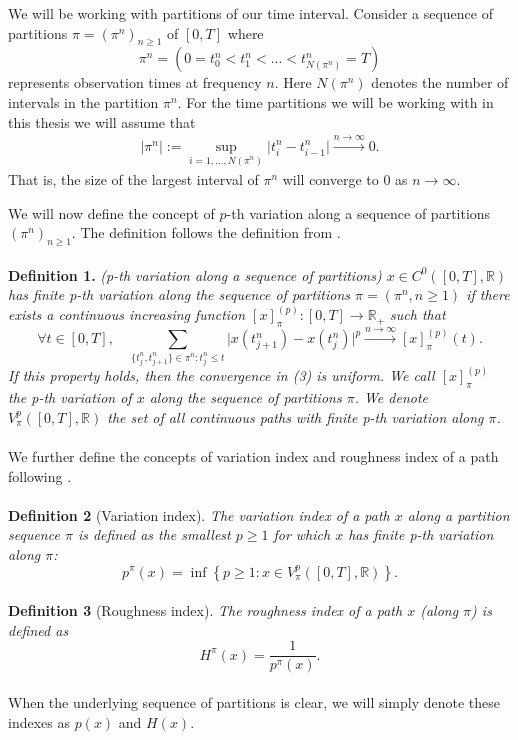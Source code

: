 \documentclass{article}
\begin{document}
We will be working with partitions of our time interval. Consider a sequence of partitions $\pi = (\pi^n) _{n\geq 1}$ of $[0,T]$ where
\[
\pi^n = \left( 0 = t_0^n < t_1^n < ... < t^n_{N(\pi^n)}=T \right)
\]
represents observation times at frequency $n$. Here $N(\pi^n)$ denotes the number of intervals in the partition $\pi^n$. For the time partitions we will be working with in this thesis we will assume that 
\begin{align}
\lvert \pi^n \rvert := \sup_{i=1, \dots, N(\pi^n)} \lvert t_i^n - t_{i-1}^n \rvert \xrightarrow{n \to \infty} 0.
\end{align}
That is, the size of the largest interval of $\pi^n$ will converge to 0 as $n\rightarrow \infty$.

We will now define the concept of $p$-th variation along a sequence of partitions $(\pi^n) _{n\geq 1}$. The definition follows the definition from \cite{cont2}.\\\\ 
\textbf{Definition 1.} \textit{(p-th variation along a sequence of partitions) 
$x \in C^0([0,T], \mathbb{R})$ has finite p-th variation along the sequence of partitions 
$\pi = (\pi^n, n \geq 1)$ if there exists a continuous increasing function $[x]_{\pi}^{(p)}: [0,T] \to \mathbb{R}_+$ such that
\[
\forall t \in [0,T], \quad \sum_{\{t_j^n, t_{j+1}^n\} \in \pi^n: t_j^n \leq t} \lvert x(t_{j+1}^n) - x(t_j^n) \rvert^p 
\xrightarrow{n \to \infty} [x]_{\pi}^{(p)}(t). \tag{3}
\]
If this property holds, then the convergence in (3) is uniform. We call $[x]_{\pi}^{(p)}$ the p-th variation of $x$ along the sequence of partitions $\pi$. We denote $V_\pi^p([0,T], \mathbb{R})$ the set of all continuous paths with finite p-th variation along $\pi$.}\\\\
We further define the concepts of variation index and roughness index of a path following \cite{cont}. \\\\
\textbf{Definition 2} (Variation index). \textit{The variation index of a path $x$ along a partition sequence $\pi$ is defined as the smallest $p \geq 1$ for which $x$ has finite p-th variation along $\pi$:}
\[
p^{\pi}(x) = \inf \left\{ p \geq 1 : x \in V_{\pi}^p([0,T], \mathbb{R}) \right\}.
\]\\
\textbf{Definition 3} (Roughness index). \textit{The roughness index of a path $x$ (along $\pi$) is defined as}
\[
H^{\pi}(x) = \frac{1}{p^{\pi}(x)}.
\]\\
When the underlying sequence of partitions is clear, we will simply denote these indexes as $p(x)$ and $H(x)$. \\\\
\end{document}
